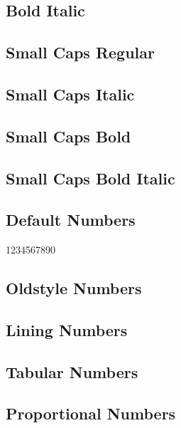 \documentclass{article}
\begin{document}
\subsection*{Bold Italic}

\textbf{\textit{\lipsum[4]}}

\subsection*{Small Caps Regular}
\textsc{\lipsum[5]}

\subsection*{Small Caps Italic}
\textsc{\textit{\lipsum[6]}}

\subsection*{Small Caps Bold}
\textsc{\textbf{\lipsum[7]}}

\subsection*{Small Caps Bold Italic}

\textsc{\textbf{\textit{\lipsum[8]}}}

\subsection*{Default Numbers}

1234567890

\subsection*{Oldstyle Numbers}


\subsection*{Lining Numbers}


\subsection*{Tabular Numbers}


\subsection*{Proportional Numbers}
\end{document}
